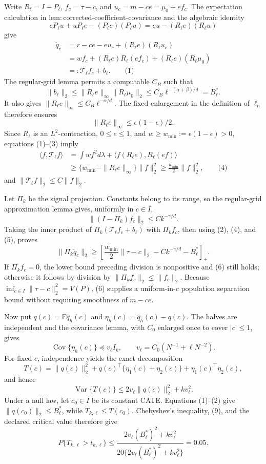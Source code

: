 Write \(R_\ell=I-P_\ell\), \(f_c=\tau-c\), and \(u_c=m-ce=\mu_0+ef_c\).  The expectation calculation in \(\mathrm{lem:corrected\mbox{-}coefficient\mbox{-}covariance}\) and the algebraic identity
\[
 eP_\ell u+uP_\ell e-(P_\ell e)(P_\ell u)
 =eu-(R_\ell e)(R_\ell u)
\]
give
\[
\begin{aligned}
 \widetilde q_c
 &=r-ce-eu_c+(R_\ell e)(R_\ell u_c)\\
 &=w f_c+(R_\ell e)R_\ell(ef_c)+(R_\ell e)(R_\ell\mu_0)\\
 &=:\mathcal T_\ell f_c+b_\ell. \qquad\text{(1)}
\end{aligned}
\]
The regular-grid lemma permits a computable \(C_B\) such that
\[
 \|b_\ell\|_2
 \le\|R_\ell e\|_\infty\|R_\ell\mu_0\|_2
 \le C_B\ell^{-(\alpha+\beta)/d}=B_\ell^*. \tag{2}
\]
It also gives \(\|R_\ell e\|_\infty\le C_B\ell^{-\alpha/d}\).  The fixed enlargement in the definition of \(\ell_n\) therefore ensures
\[
 \|R_\ell e\|_\infty\le\epsilon(1-\epsilon)/2. \tag{3}
\]
Since \(R_\ell\) is an \(L^2\)-contraction, \(0\le e\le1\), and \(w\ge w_{\min}:=\epsilon(1-\epsilon)>0\), equations (1)--(3) imply
\[
\begin{aligned}
 \langle f,\mathcal T_\ell f\rangle
 &=\int wf^2d\lambda+\langle f(R_\ell e),R_\ell(ef)\rangle\\
 &\ge\{w_{\min}-\|R_\ell e\|_\infty\}\|f\|_2^2
 \ge\frac{w_{\min}}2\|f\|_2^2, \qquad\text{(4)}
\end{aligned}
\]
and \(\|\mathcal T_\ell f\|_2\le C\|f\|_2\).

Let \(\Pi_k\) be the signal projection.  Constants belong to its range, so the regular-grid approximation lemma gives, uniformly in \(c\in I\),
\[
 \|(I-\Pi_k)f_c\|_2\le Ck^{-\gamma/d}. \tag{5}
\]
Taking the inner product of \(\Pi_k(\mathcal T_\ell f_c+b_\ell)\) with \(\Pi_kf_c\), then using (2), (4), and (5), proves
\[
 \|\Pi_k\widetilde q_c\|_2
 \ge\left[\frac{w_{\min}}2\|\tau-c\|_2
              -Ck^{-\gamma/d}-B_\ell^*\right]_+. \tag{6}
\]
If \(\Pi_kf_c=0\), the lower bound preceding division is nonpositive and (6) still holds; otherwise it follows by division by \(\|\Pi_kf_c\|_2\le\|f_c\|_2\).  Because \(\inf_{c\in I}\|\tau-c\|_2^2=V(P)\), (6) supplies a uniform-in-\(c\) population separation bound without requiring smoothness of \(m-ce\).

Now put \(q(c)=\mathbb E\widehat q_h(c)\) and \(\eta_h(c)=\widehat q_h(c)-q(c)\).  The halves are independent and the covariance lemma, with \(C_0\) enlarged once to cover \(|c|\le1\), gives
\[
 \operatorname{Cov}\{\eta_h(c)\}\preceq v_\ell I_k,
 \qquad v_\ell=C_0(N^{-1}+\ell N^{-2}). \tag{7}
\]
For fixed \(c\), independence yields the exact decomposition
\[
 T(c)=\|q(c)\|_2^2+q(c)^\top\{\eta_1(c)+\eta_2(c)\}
             +\eta_1(c)^\top\eta_2(c), \tag{8}
\]
and hence
\[
 \operatorname{Var}\{T(c)\}
 \le2v_\ell\|q(c)\|_2^2+kv_\ell^2. \tag{9}
\]
Under a null law, let \(c_0\in I\) be its constant CATE.  Equations (1)--(2) give \(\|q(c_0)\|_2\le B_\ell^*\), while \(T_{k,\ell}\le T(c_0)\).  Chebyshev's inequality, (9), and the declared critical value therefore give
\[
 P\{T_{k,\ell}>t_{k,\ell}\}
 \le\frac{2v_\ell(B_\ell^*)^2+kv_\ell^2}
 {20\{2v_\ell(B_\ell^*)^2+kv_\ell^2\}}
 =0.05. \tag{10}
\]

